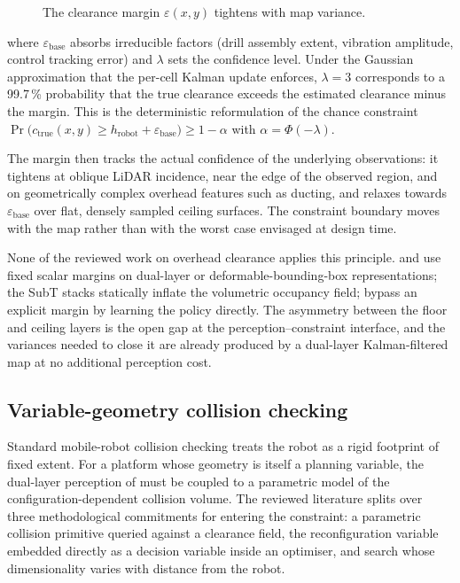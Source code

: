 \documentclass[11pt,a4paper]{article}
\begin{document}
\begin{figure}[t]
  \centering
  \resizebox{\linewidth}{!}{}
  \caption{The clearance margin $\varepsilon(x,y)$ tightens with map variance.}
  \label{fig:margin}
\end{figure}

where $\varepsilon_{\text{base}}$ absorbs irreducible factors (drill assembly extent, vibration amplitude, control tracking error) and $\lambda$ sets the confidence level. Under the Gaussian approximation that the per-cell Kalman update enforces, $\lambda = 3$ corresponds to a 99.7\,\% probability that the true clearance exceeds the estimated clearance minus the margin. This is the deterministic reformulation of the chance constraint $\Pr\bigl(c_{\text{true}}(x,y) \geq h_{\text{robot}} + \varepsilon_{\text{base}}\bigr) \geq 1 - \alpha$ with $\alpha = \Phi(-\lambda)$.

The margin then tracks the actual confidence of the underlying observations: it tightens at oblique LiDAR incidence, near the edge of the observed region, and on geometrically complex overhead features such as ducting, and relaxes towards $\varepsilon_{\text{base}}$ over flat, densely sampled ceiling surfaces. The constraint boundary moves with the map rather than with the worst case envisaged at design time.

None of the reviewed work on overhead clearance applies this principle. \citet{buchananWalkingPostureAdaptation2019} and \citet{DeformableConfigurationPlanning} use fixed scalar margins on dual-layer or deformable-bounding-box representations; the SubT stacks \citep{aghaNeBulaQuestRobotic2021,tranzattoTeamCERBERUSWins2024} statically inflate the volumetric occupancy field; \citet{mikiLearningWalkConfined2024} bypass an explicit margin by learning the policy directly. The asymmetry between the floor and ceiling layers is the open gap at the perception–constraint interface, and the variances needed to close it are already produced by a dual-layer Kalman-filtered map at no additional perception cost.

\subsection{Variable-geometry collision checking}
\label{sec:sq3:collision}

Standard mobile-robot collision checking treats the robot as a rigid footprint of fixed extent. For a platform whose geometry is itself a planning variable, the dual-layer perception of  must be coupled to a parametric model of the configuration-dependent collision volume. The reviewed literature splits over three methodological commitments for entering the constraint: a parametric collision primitive queried against a clearance field, the reconfiguration variable embedded directly as a decision variable inside an optimiser, and search whose dimensionality varies with distance from the robot.
\end{document}
